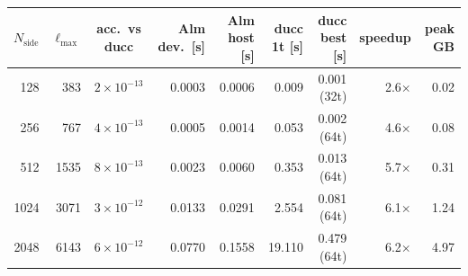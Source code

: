\begin{tabular}{rrcrrrrrr}
\toprule
$N_\mathrm{side}$ & $\ell_{\max}$ & acc.\ vs ducc & Alm dev.\ [s] & Alm host [s] & ducc 1t [s] & ducc best [s] & speedup & peak GB \\
\midrule
128 & 383 & $2\times10^{-13}$ & 0.0003 & 0.0006 & 0.009 & 0.001 (32t) & 2.6$\times$ & 0.02 \\
256 & 767 & $4\times10^{-13}$ & 0.0005 & 0.0014 & 0.053 & 0.002 (64t) & 4.6$\times$ & 0.08 \\
512 & 1535 & $8\times10^{-13}$ & 0.0023 & 0.0060 & 0.353 & 0.013 (64t) & 5.7$\times$ & 0.31 \\
1024 & 3071 & $3\times10^{-12}$ & 0.0133 & 0.0291 & 2.554 & 0.081 (64t) & 6.1$\times$ & 1.24 \\
2048 & 6143 & $6\times10^{-12}$ & 0.0770 & 0.1558 & 19.110 & 0.479 (64t) & 6.2$\times$ & 4.97 \\
\bottomrule
\end{tabular}
